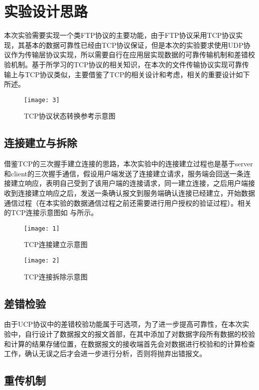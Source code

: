 \documentclass[lang=cn,11pt]{elegantpaper}
\begin{document}
\section{实验设计思路}

本次实验需要实现一个类FTP协议的主要功能，由于FTP协议采用TCP协议实现，其基本的数据可靠性已经由TCP协议保证，但是本次的实验要求使用UDP协议作为传输层协议实现，所以需要自行在应用层实现数据的可靠传输机制和差错校验机制。基于所学习的TCP协议的相关知识，在本次的文件传输协议实现可靠传输上与TCP协议类似，主要借鉴了TCP的相关设计和考虑，相关的重要设计如下所述。

\begin{figure}[htbp]
	\centering
	\texttt{[image: 3]}
	\caption{TCP协议状态转换参考示意图 \label{fig:3}}
\end{figure}


\subsection{连接建立与拆除}

借鉴TCP的三次握手建立连接的思路，本次实验中的连接建立过程也是基于server和client的三次握手通信，假设用户端发送了连接建立请求，服务端会回送一条连接建立响应，表明自己受到了该用户端的连接请求，同一建立连接，之后用户端接收到连接建立响应之后，发送一条确认报文到服务端确认连接已经建立，开始数据通信过程（在本实验的数据通信过程之前还需要进行用户授权的验证过程）。相关的TCP连接示意图如 与所示。 

\begin{figure}[htbp]
	\centering
	\texttt{[image: 1]}
	\caption{TCP连接建立示意图 \label{fig:1}}
\end{figure}%

\begin{figure}[htbp]
	\centering
	\texttt{[image: 2]}
	\caption{TCP连接拆除示意图 \label{fig:2}}
\end{figure}%

\subsection{差错检验}
由于UCP协议中的差错校验功能属于可选项，为了进一步提高可靠性，在本次实验中，自行设计了数据报文的报文首部，在其中添加了对数据字段所有数据的校验和计算的结果存储位置，在数据报文的接收端首先会对数据进行校验和的计算检查工作，确认无误之后才会进一步进行分析，否则将抛弃出错报文。


\subsection{重传机制}
\end{document}
